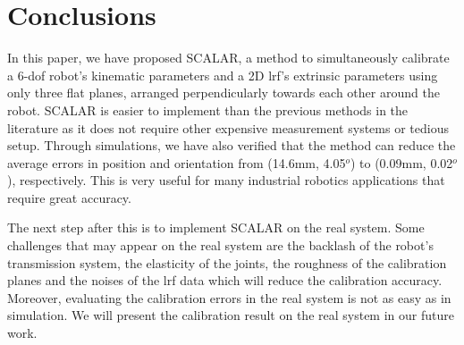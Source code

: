 \section{Conclusions}
\label{sec:conclusions}

In this paper, we have proposed SCALAR, a method to simultaneously calibrate a 6-\ac{dof} robot's kinematic parameters and a 2D \ac{lrf}'s extrinsic parameters using only three flat planes, arranged perpendicularly towards each other around the robot. SCALAR is easier to implement than the previous methods in the literature as it does not require other expensive measurement systems or tedious setup. Through simulations, we have also verified that the method can reduce the average errors in position and orientation from (14.6mm, 4.05$^o$) to (0.09mm, 0.02$^o$), respectively. This is very useful for many industrial robotics applications that require great accuracy. 

The next step after this is to implement SCALAR on the real system. Some challenges that may appear on the real system are the backlash of the robot's transmission system, the elasticity of the joints, the roughness of the calibration planes and the noises of the \ac{lrf} data which will reduce the calibration accuracy. Moreover, evaluating the calibration errors in the real system is not as easy as in simulation. We will present the calibration result on the real system in our future work. 